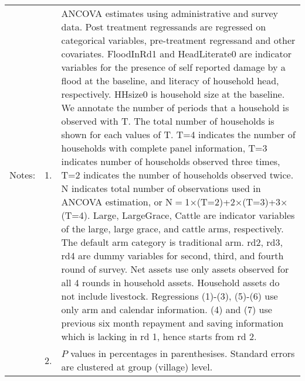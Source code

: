 \begin{minipage}[t]{14cm}
\begin{tabular}{>{\hfill\scriptsize}p{1cm}<{}>{\hfill\scriptsize}p{.25cm}<{}>{\scriptsize}p{12cm}<{\hfill}}
Notes: & 1. & ANCOVA estimates using administrative and survey data. Post treatment regressands are regressed on categorical variables, pre-treatment regressand and other covariates. \textsf{FloodInRd1} and \textsf{HeadLiterate0} are indicator variables for the presence of self reported damage by a flood at the baseline, and literacy of household head, respectively. \textsf{HHsize0} is household size at the baseline. We annotate the number of periods that a household is observed with \textsf{T}. The total number of households is shown for each values of \textsf{T}. \textsf{T=4} indicates the number of households with complete panel information, \textsf{T=3} indicates number of households observed three times, \textsf{T=2} indicates the number of households observed twice. \textsf{N} indicates total number of observations used in ANCOVA estimation, or \textsf{N$=$1$\times$(T=2)+2$\times$(T=3)+3$\times$(T=4)}.  \textsf{Large}, \textsf{LargeGrace}, \textsf{Cattle} are indicator variables of the \textsf{large}, \textsf{large grace}, and \textsf{cattle} arms, respectively. The default arm category is \textsf{traditional} arm. \textsf{rd2, rd3, rd4} are dummy variables for second, third, and fourth round of survey. Net assets use only assets observed for all 4 rounds in household assets. Household assets do not include livestock. Regressions (1)-(3), (5)-(6) use only arm and calendar information. (4) and (7) use previous six month repayment and saving information which is lacking in rd 1, hence starts from rd 2.\\
& 2. & $P$ values in percentages in parenthesises. Standard errors are clustered at group (village) level.
\end{tabular}
\end{minipage}

